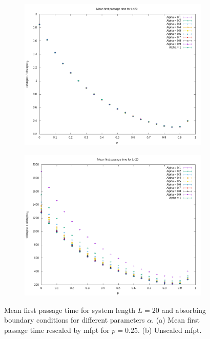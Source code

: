 \documentclass[]{scrartcl}
\begin{document}
 \begin{figure}[!hbt]
\centering
\begin{subfigure}{0.45\textwidth}
 \includegraphics[width=\textwidth]{./fig/latt/alpha/L=20/fpt.png}
\end{subfigure}
\begin{subfigure}{0.45\textwidth}
 \includegraphics[width=\textwidth]{./fig/latt/alpha/L=20/fpt2.png}
\end{subfigure}
\caption{Mean first passage time for system length $L = 20$ and absorbing boundary conditions for different parameters $\alpha$. (a) Mean first passage time rescaled by mfpt for $p = 0.25$. (b) Unscaled mfpt.} 
\label{fig:latt-alpha-fpts20}
\end{figure}
\end{document}
